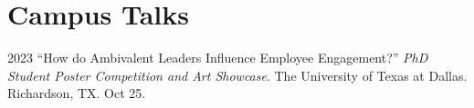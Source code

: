 \documentclass[12pt,letterpaper]{report} %
\begin{document}









    \section*{Campus Talks}

    \begin{tablist}


        \item[2023]\tab{}\enquote{How do Ambivalent Leaders Influence Employee Engagement?} \textit{PhD Student Poster Competition and Art Showcase}. The University of Texas at Dallas. Richardson, TX. Oct 25.

    \end{tablist}


\end{document}
